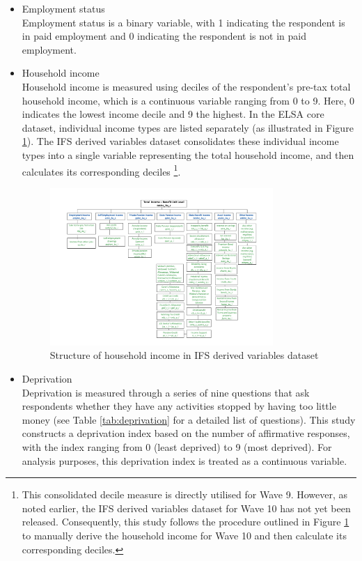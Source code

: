 \begin{itemize}[wide=0pt, leftmargin=*, labelwidth=0pt, labelindent=\parindent, itemindent=0pt]
    \item Employment status \\
    Employment status is a binary variable, with 1 indicating the respondent is in paid employment and 0 indicating the respondent is not in paid employment. 
    \item Household income \\
    Household income is measured using deciles of the respondent's pre-tax total household income, which is a continuous variable ranging from 0 to 9. Here, 0 indicates the lowest income decile and 9 the highest. In the ELSA core dataset, individual income types are listed separately (as illustrated in Figure \ref{fig:household_income}). The IFS derived variables dataset consolidates these individual income types into a single variable representing the total household income, and then calculates its corresponding deciles \footnote{This consolidated decile measure is directly utilised for Wave 9. However, as noted earlier, the IFS derived variables dataset for Wave 10 has not yet been released. Consequently, this study follows the procedure outlined in Figure \ref{fig:household_income} to manually derive the household income for Wave 10 and then calculate its corresponding deciles.}. 

    \begin{figure}
        \centering
        \caption{Structure of household income in IFS derived variables dataset}
        \label{fig:household_income}
        \includegraphics[width=0.8\textwidth]{figures/household_income.jpg}
    \end{figure}

    \item Deprivation \\
    Deprivation is measured through a series of nine questions that ask respondents whether they have any activities stopped by having too little money (see Table \ref{tab:deprivation} for a detailed list of questions). This study constructs a deprivation index based on the number of affirmative responses, with the index ranging from 0 (least deprived) to 9 (most deprived). For analysis purposes, this deprivation index is treated as a continuous variable.


\end{itemize}
